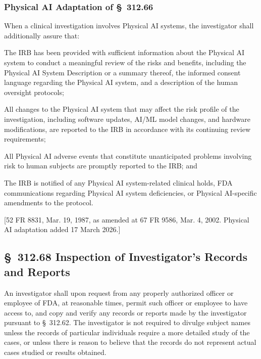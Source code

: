 \subsubsection{Physical AI Adaptation of \S~312.66}

When a clinical investigation involves Physical AI systems, the investigator shall additionally assure that:

\begin{description}[leftmargin=0.8cm,style=sameline]
\item[(a)] The IRB has been provided with sufficient information about the Physical AI system to conduct a meaningful review of the risks and benefits, including the Physical AI System Description or a summary thereof, the informed consent language regarding the Physical AI system, and a description of the human oversight protocols;
\item[(b)] All changes to the Physical AI system that may affect the risk profile of the investigation, including software updates, AI/ML model changes, and hardware modifications, are reported to the IRB in accordance with its continuing review requirements;
\item[(c)] All Physical AI adverse events that constitute unanticipated problems involving risk to human subjects are promptly reported to the IRB; and
\item[(d)] The IRB is notified of any Physical AI system-related clinical holds, FDA communications regarding Physical AI system deficiencies, or Physical AI-specific amendments to the protocol.
\end{description}

[52 FR 8831, Mar. 19, 1987, as amended at 67 FR 9586, Mar. 4, 2002. Physical AI adaptation added 17 March 2026.]

\subsection{\S~312.68 Inspection of Investigator's Records and Reports}

An investigator shall upon request from any properly authorized officer or employee of FDA, at reasonable times, permit such officer or employee to have access to, and copy and verify any records or reports made by the investigator pursuant to \S~312.62. The investigator is not required to divulge subject names unless the records of particular individuals require a more detailed study of the cases, or unless there is reason to believe that the records do not represent actual cases studied or results obtained.

